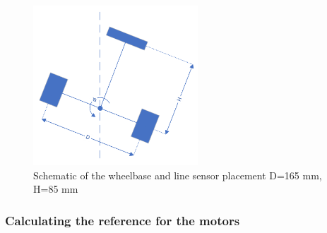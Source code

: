 \documentclass[english]{article}
\begin{document}
 \begin{figure}[!h]
    \centering
    \includegraphics[width=0.55\textwidth, height=0.35\textheight]{figures/tut.png}
    \caption{Schematic of the wheelbase and line sensor placement\newline 
    D=165 mm, H=85 mm}
    \label{fig:turt}
\end{figure}
\subsubsection{Calculating the reference for the motors}
\end{document}
